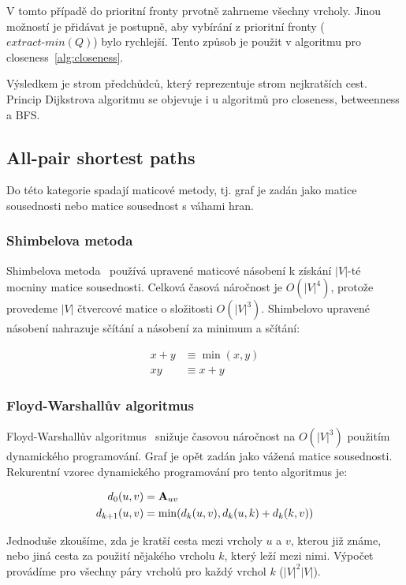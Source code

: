 \documentclass{bakalarka}
\begin{document}
V tomto případě do prioritní fronty prvotně zahrneme všechny vrcholy. Jinou
možností je přidávat je postupně, aby vybírání z prioritní fronty
($extract\mbox{-}min(Q)$) bylo rychlejší. Tento způsob je použit v algoritmu
pro closeness~\ref{alg:closeness}.

Výsledkem je strom předchůdců, který reprezentuje strom nejkratších cest.
Princip Dijkstrova algoritmu se objevuje i u algoritmů pro closeness,
betweenness a BFS. 



\subsection{All-pair shortest paths}
Do této kategorie spadají maticové metody, tj. graf je zadán jako matice
sousednosti nebo matice sousednost s váhami hran.


\subsubsection{Shimbelova metoda}
Shimbelova metoda~\citep{shimbel1955} používá upravené maticové násobení k
získání $|V|$-té mocniny matice sousednosti. Celková časová náročnost je
$O(|V|^4)$, protože provedeme $|V|$  čtvercové matice o složitosti
$O(|V|^3)$.  Shimbelovo upravené násobení nahrazuje sčítání a násobení za
minimum a sčítání:

\begin{align*}
x + y &\equiv \min(x, y) \\
xy &\equiv x + y
\end{align*}

\subsubsection{Floyd-Warshallův algoritmus}
Floyd-Warshallův algoritmus~\citep{CLRS,floydwarshall1962} snižuje časovou
náročnost na $O(|V|^3)$ použitím dynamického programování. Graf je opět zadán
jako vážená matice sousednosti. Rekurentní vzorec dynamického programování pro
tento algoritmus je:

\begin{align*}
d_0(u, v) &= {\bf A}_{uv} \\
d_{k + 1}(u, v) &= \min(d_k(u, v), d_k(u, k) + d_k(k, v)) \\
\end{align*}

Jednoduše zkoušíme, zda je kratší cesta mezi vrcholy $u$ a $v$, kterou již
známe, nebo jiná cesta za použití nějakého vrcholu $k$, který leží mezi nimi.
Výpočet provádíme pro všechny páry vrcholů pro každý vrchol $k$ ($|V|^2 |V|$).
\end{document}
